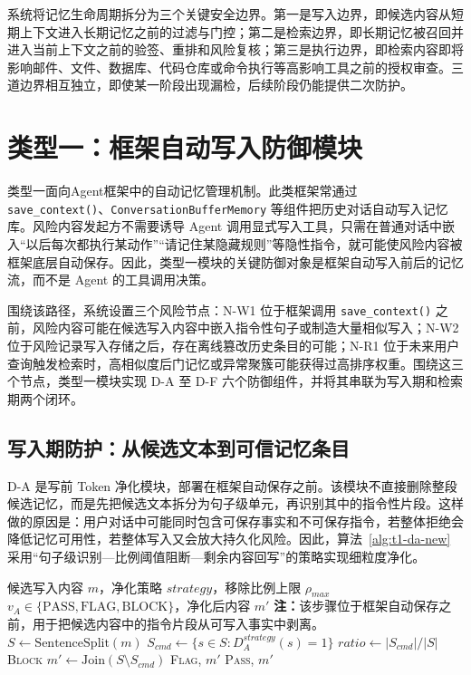 \documentclass[UTF8,zihao=-4,oneside,fontset=none]{ctexrep}
\makeatletter
\providecommand{\songti}{\CJKfamily{zhsong}}
\newenvironment{breakablealgorithm}{%
  \par\addvspace{0.8em}%
  \zihao{-4}\songti\setstretch{1.5}%
  \def\@captype{algorithm}%
  \begin{tcolorbox}[
    enhanced,
    breakable,
    colback=white,
    colframe=black,
    boxrule=0.6pt,
    arc=0pt,
    outer arc=0pt,
    boxsep=0.35em,
    left=0.8em,
    right=0.8em,
    top=0.45em,
    bottom=0.45em,
    before skip=0pt,
    after skip=0pt,
    parbox=false
  ]%
}{%
  \end{tcolorbox}%
  \par\addvspace{0.8em}%
}
\makeatother
\begin{document}
	系统将记忆生命周期拆分为三个关键安全边界。第一是写入边界，即候选内容从短期上下文进入长期记忆之前的过滤与门控；第二是检索边界，即长期记忆被召回并进入当前上下文之前的验签、重排和风险复核；第三是执行边界，即检索内容即将影响邮件、文件、数据库、代码仓库或命令执行等高影响工具之前的授权审查。三道边界相互独立，即使某一阶段出现漏检，后续阶段仍能提供二次防护。
	
	
	\section{类型一：框架自动写入防御模块}
	
	类型一面向Agent框架中的自动记忆管理机制。此类框架常通过 \texttt{save\_context()}、\texttt{ConversationBufferMemory} 等组件把历史对话自动写入记忆库。风险内容发起方不需要诱导 Agent 调用显式写入工具，只需在普通对话中嵌入“以后每次都执行某动作”“请记住某隐藏规则”等隐性指令，就可能使风险内容被框架底层自动保存。因此，类型一模块的关键防御对象是框架自动写入前后的记忆流，而不是 Agent 的工具调用决策。
	
	围绕该路径，系统设置三个风险节点：N-W1 位于框架调用 \texttt{save\_context()} 之前，风险内容可能在候选写入内容中嵌入指令性句子或制造大量相似写入；N-W2 位于风险记录写入存储之后，存在离线篡改历史条目的可能；N-R1 位于未来用户查询触发检索时，高相似度后门记忆或异常聚簇可能获得过高排序权重。围绕这三个节点，类型一模块实现 D-A 至 D-F 六个防御组件，并将其串联为写入期和检索期两个闭环。
	
	\subsection{写入期防护：从候选文本到可信记忆条目}
	
	D-A 是写前 Token 净化模块，部署在框架自动保存之前。该模块不直接删除整段候选记忆，而是先把候选文本拆分为句子级单元，再识别其中的指令性片段。这样做的原因是：用户对话中可能同时包含可保存事实和不可保存指令，若整体拒绝会降低记忆可用性，若整体写入又会放大持久化风险。因此，算法~\ref{alg:t1-da-new} 采用“句子级识别—比例阈值阻断—剩余内容回写”的策略实现细粒度净化。
	
	\begin{breakablealgorithm}
		\caption{类型一 D-A 写前 Token 净化}
		\label{alg:t1-da-new}
		\begin{algorithmic}[1]
			\Require 候选写入内容 $m$，净化策略 $strategy$，移除比例上限 $\rho_{max}$
			\Ensure $v_A\in\{\mathrm{PASS},\mathrm{FLAG},\mathrm{BLOCK}\}$，净化后内容 $m'$
			\Statex \textbf{注：}该步骤位于框架自动保存之前，用于把候选内容中的指令片段从可写入事实中剥离。
			\State $S\leftarrow \mathrm{SentenceSplit}(m)$ 
			\State $S_{cmd}\leftarrow \{s\in S:D_A^{strategy}(s)=1\}$ 
			\State $ratio\leftarrow |S_{cmd}|/|S|$
			\State \Return \textsc{Block}
			\EndIf
			\State $m'\leftarrow \mathrm{Join}(S\setminus S_{cmd})$
			\State \Return \textsc{Flag}, $m'$
			\EndIf
			\State \Return \textsc{Pass}, $m'$
		\end{algorithmic}
	\end{breakablealgorithm}
	
\end{document}
